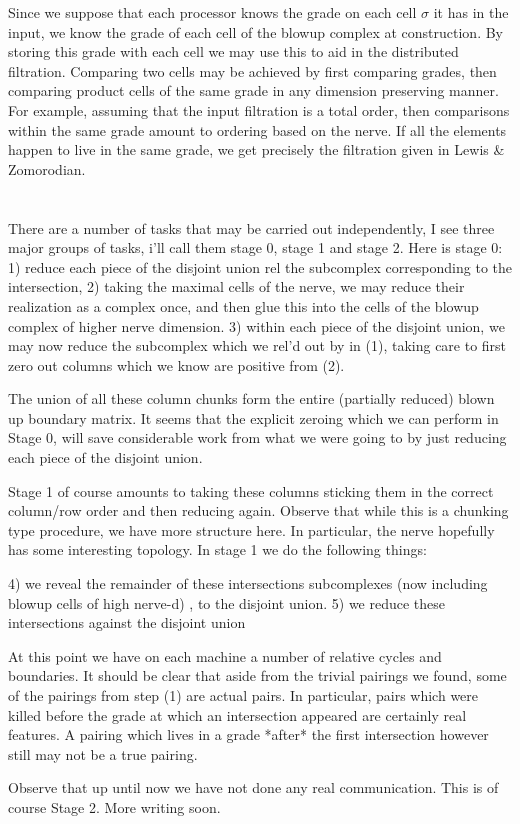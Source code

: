 \documentclass{article}
\begin{document}
Since we suppose that each processor knows the grade on each cell $\sigma$ it 
has in the input, we know the grade of each cell of the blowup complex at 
construction.  By storing this grade with each cell we may use this to aid in 
the distributed filtration. Comparing two cells may be achieved by first 
comparing grades, then comparing product cells of the same grade in any 
dimension preserving manner. For example, assuming that the input filtration is 
a total order, then comparisons within the same grade amount to ordering based 
on the nerve. If all the elements happen to live in the same grade, we get 
precisely the filtration given in Lewis \& Zomorodian. 
\section{}
There are a number of tasks that may be carried out independently, 
I see three major groups of tasks, i'll call them stage 0, stage 1 and stage 2. 
Here is stage 0:
1)  reduce each piece of the disjoint union rel the subcomplex corresponding to 
the intersection,
2)  taking the maximal cells of the nerve, we may reduce their realization as a 
complex once, and then glue this into the cells of the blowup complex of higher 
nerve dimension.
3) within each piece of the disjoint union, we may now reduce the subcomplex 
which we rel'd out by in (1), taking care to first zero out columns which we 
know are positive from (2). 

The union of all these column chunks form the entire (partially reduced) blown 
up boundary matrix.  It seems that the explicit zeroing which we can perform in 
Stage 0, will save considerable work from what we were going to by just reducing 
each piece of the disjoint union. 

Stage 1 of course amounts to taking these columns sticking them in the correct 
column/row order and then reducing again. Observe that while this is a chunking 
type procedure, we have more structure here. In particular, 
the nerve hopefully has some interesting topology. 
In stage 1 we do the following things:

4) we reveal the remainder of these intersections subcomplexes 
(now including blowup cells of high nerve-d) , to the disjoint union.
5) we reduce these intersections against the disjoint union

At this point we have on each machine a number of relative cycles and boundaries. 
It should be clear that aside from the trivial pairings we found, some of the 
pairings from step (1) are actual pairs. In particular, pairs which were killed 
before the grade at which an intersection appeared are certainly real features. 
A pairing which lives in a grade *after* the first intersection however still 
may not be a true pairing. 

Observe that up until now we have not done any real communication. 
This is of course Stage 2. More writing soon.
\end{document}
